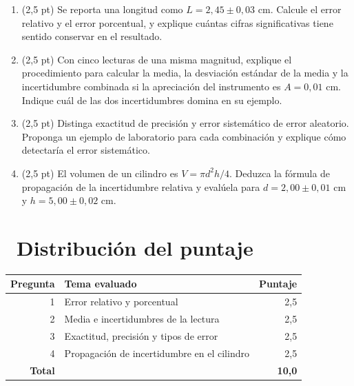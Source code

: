 \documentclass[11pt,a4paper]{article}
\newcommand{\iconotexto}[2]{\textcolor{cyanNeon}{\faIcon{#1}}~#2}
\begin{document}
\begin{enumerate}[leftmargin=1.4em,itemsep=2pt,topsep=3pt]
  \item (2,5 pt) Se reporta una longitud como $L = 2{,}45 \pm 0{,}03$ cm. Calcule el error relativo y el error porcentual, y explique cuántas cifras significativas tiene sentido conservar en el resultado.
  \item (2,5 pt) Con cinco lecturas de una misma magnitud, explique el procedimiento para calcular la media, la desviación estándar de la media y la incertidumbre combinada si la apreciación del instrumento es $A = 0{,}01$ cm. Indique cuál de las dos incertidumbres domina en su ejemplo.
  \item (2,5 pt) Distinga exactitud de precisión y error sistemático de error aleatorio. Proponga un ejemplo de laboratorio para cada combinación y explique cómo detectaría el error sistemático.
  \item (2,5 pt) El volumen de un cilindro es $V = \pi d^2 h/4$. Deduzca la fórmula de propagación de la incertidumbre relativa y evalúela para $d = 2{,}00 \pm 0{,}01$ cm y $h = 5{,}00 \pm 0{,}02$ cm.
\end{enumerate}

\section{\iconotexto{ruler-combined}{Distribución del puntaje}}

\begin{tabularx}{\linewidth}{@{}r X r@{}}
\toprule
Pregunta & Tema evaluado & Puntaje\\
\midrule
1 & Error relativo y porcentual & 2,5 \\
2 & Media e incertidumbres de la lectura & 2,5 \\
3 & Exactitud, precisión y tipos de error & 2,5 \\
4 & Propagación de incertidumbre en el cilindro & 2,5 \\
\midrule
\textbf{Total} & & \textbf{10,0}\\
\bottomrule
\end{tabularx}
\end{document}
